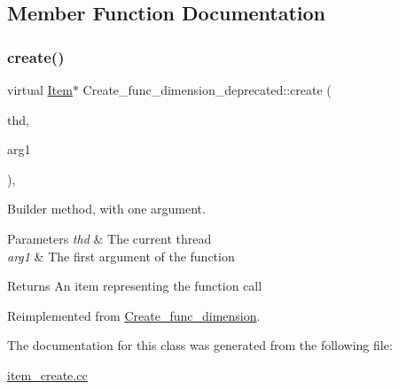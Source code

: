 \subsection{Member Function Documentation}
\mbox{\label{classCreate__func__dimension__deprecated_af75eca8b756e87b951297f98a20017c6}} 
\subsubsection{\texorpdfstring{create()}{create()}}
{\footnotesize\ttfamily virtual \mbox{\hyperlink{classItem}{Item}}$\ast$ Create\+\_\+func\+\_\+dimension\+\_\+deprecated\+::create (\begin{DoxyParamCaption}\item[{T\+HD $\ast$}]{thd,  }\item[{\mbox{\hyperlink{classItem}{Item}} $\ast$}]{arg1 }\end{DoxyParamCaption})\hspace{0.3cm}{\ttfamily [inline]}, {\ttfamily [virtual]}}

Builder method, with one argument. 
\begin{DoxyParams}{Parameters}
{\em thd} & The current thread \\
\hline
{\em arg1} & The first argument of the function \\
\hline
\end{DoxyParams}
\begin{DoxyReturn}{Returns}
An item representing the function call 
\end{DoxyReturn}


Reimplemented from \mbox{\hyperlink{classCreate__func__dimension_a0bb53cc401570127d5ad15c5eb801f39}{Create\+\_\+func\+\_\+dimension}}.



The documentation for this class was generated from the following file\+:\begin{DoxyCompactItemize}
\item 
\mbox{\hyperlink{item__create_8cc}{item\+\_\+create.\+cc}}\end{DoxyCompactItemize}
